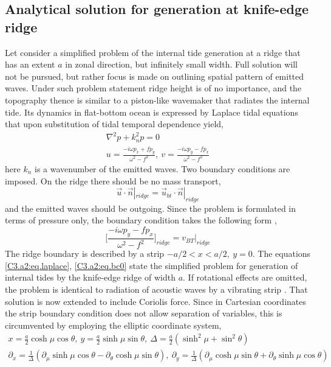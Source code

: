 \documentclass[12pt]{article}
\begin{document}
\subsection{Analytical solution for generation at knife-edge ridge}
Let consider a simplified problem of the internal tide generation at a ridge that has an 
extent $a$ in zonal direction, but infinitely small width. Full solution will not be pursued, but 
rather focus is made on outlining spatial pattern of emitted waves. Under such problem statement 
ridge height is of no importance, and the topography thence is similar to a piston-like 
wavemaker that radiates the internal tide. Its dynamics in flat-bottom ocean is expressed by 
Laplace tidal equations that upon substitution of tidal temporal dependence yield,
\begin{align}
\nabla^2 p + k_n^2 p = 0\\
u = \frac{-i \omega p_x + f p_y}{\omega^2 - f^2},~v = \frac{-i \omega p_y - f p_x}{\omega^2 - f^2}
\label{C3.a2:eq.laplace}
\end{align}
here $k_n$ is a wavenumber of the emitted waves. Two boundary conditions are imposed. 
On the ridge there should be no mass transport, 
\begin{equation}
\vec{u}\cdot \vec{n}|_{ridge} = \vec{u}_{bt} \cdot \vec{n} |_{ridge}
\end{equation}
and the emitted waves should be outgoing. Since the problem is formulated in terms of pressure 
only, the boundary condition takes the following form \citep{greenspan1968theory},
\begin{equation}
\Big[ \frac{-i \omega p_y - f p_x}{\omega^2 - f^2} \Big]_{ridge} = v_{BT}|_{ridge}
\label{C3.a2:eq.bc0}
\end{equation}
The ridge boundary is described by a strip $-a/2 < x < a/2,~y=0$. The equations 
\eqref{C3.a2:eq.laplace}, \eqref{C3.a2:eq.bc0} state the simplified problem for generation of 
internal tides by the knife-edge ridge of width $a$. If 
rotational effects are omitted, the problem is identical to 
radiation of acoustic waves by a vibrating strip \citep{morse1946methods}. That solution is now 
extended to include Coriolis force. Since in Cartesian coordinates the strip boundary condition 
does not allow separation of variables, this is circumvented by employing the elliptic coordinate 
system,
\begin{align*}
x = \frac{a}{2} \cosh \mu \cos \theta,~y = \frac{a}{2} \sinh \mu \sin \theta,~\Delta = \frac{a}{2} 
(\sinh^2 \mu + \sin^2 \theta)\\
\partial_x = 
\frac{1}{\Delta} (\partial_{\mu} \sinh \mu \cos \theta - \partial_{\theta} \cosh \mu 
\sin \theta),~\partial_y = \frac{1}{\Delta} (\partial_{\mu} \cosh \mu \sin \theta + 
\partial_{\theta} \sinh \mu \cos \theta)
\end{align*}
\end{document}
